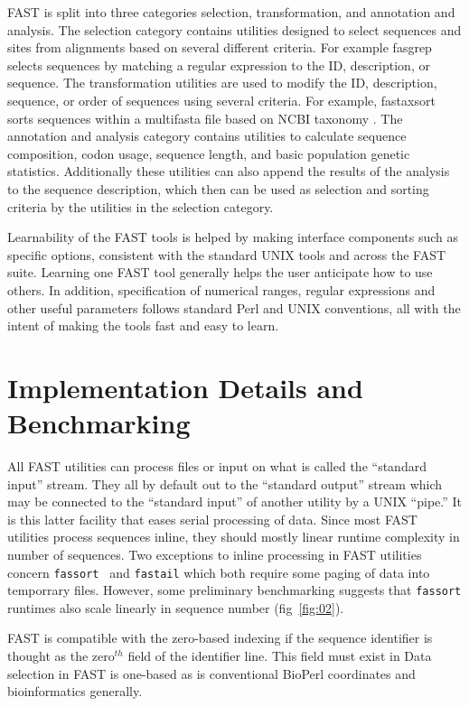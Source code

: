 \documentclass{frontiersSCNS} %
\begin{document}
FAST is split into three categories selection, transformation, and
annotation and analysis. The selection category contains utilities
designed to select sequences and sites from alignments based on
several different criteria. For example fasgrep selects sequences by
matching a regular expression to the ID, description, or sequence. The
transformation utilities are used to modify the ID, description,
sequence, or order of sequences using several criteria. For example,
fastaxsort sorts sequences within a multifasta file based on NCBI
taxonomy \citep{Benson2009, Sayers2009}. The annotation and analysis
category contains utilities to calculate sequence composition, codon
usage, sequence length, and basic population genetic
statistics. Additionally these utilities can also append the results
of the analysis to the sequence description, which then can be used as
selection and sorting criteria by the utilities in the selection
category.

Learnability of the FAST tools is helped by making interface
components such as specific options, consistent with the standard UNIX
tools and across the FAST suite. Learning one FAST tool generally
helps the user anticipate how to use others. In addition,
specification of numerical ranges, regular expressions and other
useful parameters follows standard Perl and UNIX conventions, all with
the intent of making the tools fast and easy to learn.

\section{Implementation Details and Benchmarking}

All FAST utilities can process files or input on what is called the
``standard input'' stream. They all by default out to the ``standard
output'' stream which may be connected to the ``standard input'' of
another utility by a UNIX ``pipe.'' It is this latter facility that
eases serial processing of data. Since most FAST utilities process
sequences inline, they should mostly linear runtime complexity in
number of sequences. Two exceptions to inline processing in FAST
utilities concern {\tt fassort } and {\tt fastail} which both require
some paging of data into temporrary files. However, some preliminary
benchmarking suggests that {\tt fassort} runtimes also scale linearly in
sequence number (fig~\ref{fig:02}).

FAST is compatible with the zero-based indexing if the sequence
identifier is thought as the zero$^{th}$ field of the identifier
line. This field must exist in Data selection in FAST is
one-based as is conventional BioPerl coordinates and bioinformatics
generally.
\end{document}
